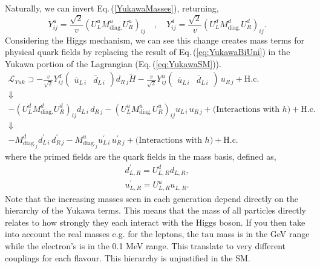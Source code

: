 Naturally, we can invert Eq.\,(\ref{YukawaMasses}), returning, 
\begin{equation}
\label{eq:YukawaBiUni}
Y^u_{ij} = \frac{\sqrt{2}}{v} (U_L^u M^u_{\text{diag.}} U_R^u)_{ij} \quad , \quad Y^d_{ij} = \frac{\sqrt{2}}{v} (U_L^d M^d_{\text{diag.}} U_R^d)_{ij} . 
\end{equation}
%
Considering the Higgs mechanism, we can see this change creates mass terms for physical quark fields by replacing the result of Eq.\,(\ref{eq:YukawaBiUni}) in the Yukawa portion of the Lagrangian (Eq.\,(\ref{eq:YukawaSM})).
%
\begin{gather}
\mathcal{L}_{Yuk} \supset 
- \frac{v}{\sqrt{2}} Y^d_{ij} \begin{pmatrix} \overline{u}_{L\,i} & \overline{d}_{L\,i}  \end{pmatrix}  d_{R\,j} \tilde{H}
%
-\frac{v}{\sqrt{2}} Y^u_{ij} \begin{pmatrix} \overline{u}_{L\,i} & \overline{d}_{L\,i}  \end{pmatrix} \, u_{R\,j} + \text{H.c.} \nonumber  \\ 
 \Downarrow \nonumber \\
-(U_L^d M^d_{\text{diag.}} U_R^d)_{ij} d_{L\,i} \, d_{R\,j}  - (U_L^u M^u_{\text{diag.}} U_R^u)_{ij} u_{L\,i} \, u_{R\,j} + \big(\text{Interactions with } h\big) + \text{H.c.} \\ 
 \Downarrow  \nonumber \\ 
-M^d_{\text{diag.}_j} d_{L\,i}^\prime \, d_{R\,j}^\prime  - M^u_{\text{diag.}_j} u_{L\,i}^\prime \, u_{R\,j}^\prime + \big(\text{Interactions with }h\big) + \text{H.c.}  \nonumber  
\end{gather}
%
where the primed fields are the quark fields in the mass basis, defined as, 
\begin{equation}
\begin{split}
d^\prime_{L,R} = U^d_{L,R} d_{L,R}, \\
u^\prime_{L,R} = U^u_{L,R} u_{L,R}. 
\end{split}  
\end{equation}
% 
Note that the increasing masses seen in each generation depend directly on the  hierarchy of the Yukawa terms. This means that the mass of all particles directly relates to how strongly they each interact with the Higgs boson.
%
If you then take into account the real masses e.g. for the leptons, the tau mass is in the GeV range while the electron's is in the 0.1 MeV range. This translate to very different couplings for each flavour. 
%
This hierarchy is unjustified in the SM. 

